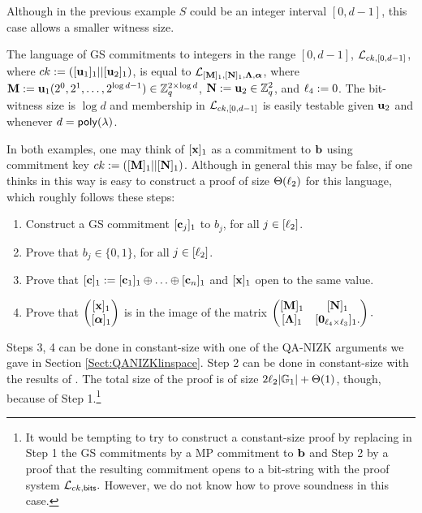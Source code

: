 Although in the previous example $S$ could be an integer interval $[0,d-1]$, this case allows a smaller witness size.

\begin{example}
The language of GS commitments to integers in the range $[0,d-1]$, $\mathcal{L}_{ck,[0,d-1]}$, where $ck:=([\mathbf{u}_1]_1||[\mathbf{u}_2]_1)$, is equal to $\mathcal{L}_{[\mathbf{{M}}]_1,[\mathbf{{N}}]_1,\mathbf{{\Lambda}},{\boldsymbol \alpha}}$, where
$\mathbf{{M}}:=\mathbf{u}_1(2^0,2^1,\ldots,2^{\log d-1})\in\mathbb{Z}_q^{2\times \log d}$, $\mathbf{{N}}:=\mathbf{u}_2\in\mathbb{Z}_q^{2}$, and ${\ell_4}:=0$. The bit-witness size is $\log d$ and membership in $\mathcal{L}_{ck,[0,d-1]}$ is easily testable given $\mathbf{u}_2$ and whenever $d=\mathsf{poly}(\lambda)$. 
\end{example}

In both examples, one may think of $[\mathbf{x}]_1$ as a commitment to $\mathbf{b}$ using commitment key $ck:=([\mathbf{{M}}]_1||[\mathbf{{N}}]_1)$. Although in general this may be false, if one thinks in this way is easy to construct a proof of size $\Theta({\ell_2})$ for this language,  which roughly follows these steps:
\begin{enumerate}
\item Construct a GS commitment $[\mathbf{c}_j]_1$ to $b_j$, for all $j \in [{\ell_2}]$.
\item Prove that $b_j \in \{0,1\}$, for all $j \in [{\ell_2}]$.
\item Prove that $[\mathbf{c}]_1:=[\mathbf{c}_1]_1 \oplus \ldots \oplus [\mathbf{c}_n]_1$ and $[\mathbf{x}]_1$ open to the same value.
\item Prove that $\pmatri
{
    [\vecb{x}]_1\\
    [\grkb{\alpha}]_1
}$ is in the image of the matrix $
\begin{pmatrix}
    [\matr{M}]_1       & [\matr{N}]_1\\
    [\matr{\Lambda}]_1 & [\matr{0}_{\ld\times \lc}]_1.
    \end{pmatrix}.$
\end{enumerate}

Steps 3, 4 can be done in constant-size with one of the QA-NIZK arguments we gave in Section \ref{Sect:QANIZKlinspace}. Step 2 can be done in constant-size with the results of \cite{AC:GonHevRaf15}. The total size of the proof is of size $2{\ell_2}|\mathbb{G}_1|+\Theta(1)$, though, because 
of Step 1.\footnote{It would be tempting to try to construct a constant-size proof by replacing in Step 1 the GS commitments by a MP commitment to $\mathbf{b}$ and Step 2 by a proof that the resulting commitment opens to a bit-string with the proof system $\mathcal{L}_{ck,\mathsf{bits}}.$ However, we do not know how to prove soundness in this case.}
